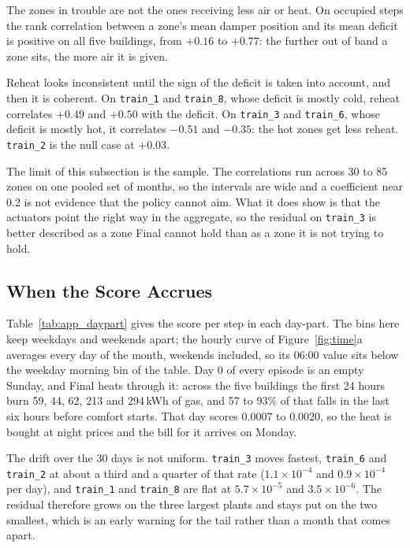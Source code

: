 \documentclass{article}
\begin{document}
The zones in trouble are not the ones receiving less air or heat. On occupied steps the rank correlation between a zone's mean damper position and its mean deficit is positive on all five buildings, from $+0.16$ to $+0.77$: the further out of band a zone sits, the more air it is given.

Reheat looks inconsistent until the sign of the deficit is taken into account, and then it is coherent. On \texttt{train\_1} and \texttt{train\_8}, whose deficit is mostly cold, reheat correlates $+0.49$ and $+0.50$ with the deficit. On \texttt{train\_3} and \texttt{train\_6}, whose deficit is mostly hot, it correlates $-0.51$ and $-0.35$: the hot zones get less reheat. \texttt{train\_2} is the null case at $+0.03$.

The limit of this subsection is the sample. The correlations run across 30 to 85 zones on one pooled set of months, so the intervals are wide and a coefficient near 0.2 is not evidence that the policy cannot aim. What it does show is that the actuators point the right way in the aggregate, so the residual on \texttt{train\_3} is better described as a zone Final cannot hold than as a zone it is not trying to hold.



\subsection{When the Score Accrues}

Table~\ref{tab:app_daypart} gives the score per step in each day-part. The bins here keep weekdays and weekends apart; the hourly curve of Figure~\ref{fig:time}a averages every day of the month, weekends included, so its 06:00 value sits below the weekday morning bin of the table. Day 0 of every episode is an empty Sunday, and Final heats through it: across the five buildings the first 24 hours burn 59, 44, 62, 213 and 294\,kWh of gas, and 57 to 93\% of that falls in the last six hours before comfort starts. That day scores 0.0007 to 0.0020, so the heat is bought at night prices and the bill for it arrives on Monday.

The drift over the 30 days is not uniform. \texttt{train\_3} moves fastest, \texttt{train\_6} and \texttt{train\_2} at about a third and a quarter of that rate ($1.1\times10^{-4}$ and $0.9\times10^{-4}$ per day), and \texttt{train\_1} and \texttt{train\_8} are flat at $5.7\times10^{-5}$ and $3.5\times10^{-6}$. The residual therefore grows on the three largest plants and stays put on the two smallest, which is an early warning for the tail rather than a month that comes apart.
\end{document}
